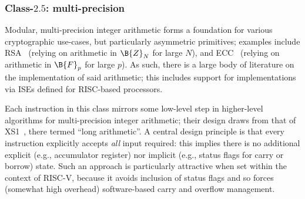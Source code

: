 
\subsubsection{Class-$2.5$: multi-precision}
\label{sec:spec:instruction:2:5}

Modular, multi-precision integer arithmetic forms a foundation for various
cryptographic use-cases, but particularly asymmetric primitives; examples 
include
RSA~\cite{SCARV:RivShaAdl:78} 
(relying on arithmetic in $\B{Z}_N$ for large $N$),
and
ECC~\cite{SCARV:Miller:85,SCARV:Koblitz:87}
(relying on arithmetic in $\B{F}_p$ for large $p$).
As such, there is a large body of literature on the implementation of said 
arithmetic; this includes support for implementations via ISEs defined for 
RISC-based processors.

Each instruction in this class 
mirrors some low-level step in higher-level algorithms for multi-precision 
integer arithmetic; their design draws from that of
XS1~\cite[Section 18]{SCARV:XS1:09},
there termed ``long arithmetic''.  A central design principle is that every
instruction explicitly accepts {\em all} input required: this implies there
is no additional
explicit (e.g., accumulator register) 
nor 
implicit (e.g., status flags for carry or borrow)
state.
Such an approach is particularly attractive when set within the context of 
RISC-V, because it avoids inclusion of status flags and so forces (somewhat 
high overhead) software-based carry and overflow management.




